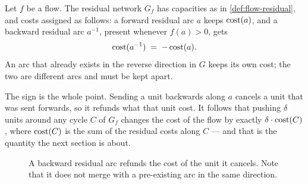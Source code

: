 \begin{definition}\label{def:mcf-residual}
Let $f$ be a flow. The residual network $G_f$ has capacities as in
\cref{def:flow-residual}, and costs assigned as follows: a forward residual arc
$a$ keeps $\operatorname{cost}(a)$, and a backward residual arc $a^{-1}$, present whenever
$f(a) > 0$, gets
\[ \operatorname{cost}(a^{-1}) \;=\; -\operatorname{cost}(a). \]
An arc that already exists in the reverse direction in $G$ keeps its own cost;
the two are different arcs and must be kept apart.
\end{definition}

The sign is the whole point. Sending a unit backwards along $a$ cancels a unit
that was sent forwards, so it refunds what that unit cost. It follows that
pushing $\delta$ units around any cycle $C$ of $G_f$ changes the cost of the
flow by exactly $\delta \cdot \operatorname{cost}(C)$, where $\operatorname{cost}(C)$ is the sum of the
residual costs along $C$ --- and that is the quantity the next section is
about.

\begin{figure}[ht]
\centering
{}
\caption{A backward residual arc refunds the cost of the unit it cancels. Note
that it does not merge with a pre-existing arc in the same direction.}
\label{fig:mcf-residual}
\end{figure}

